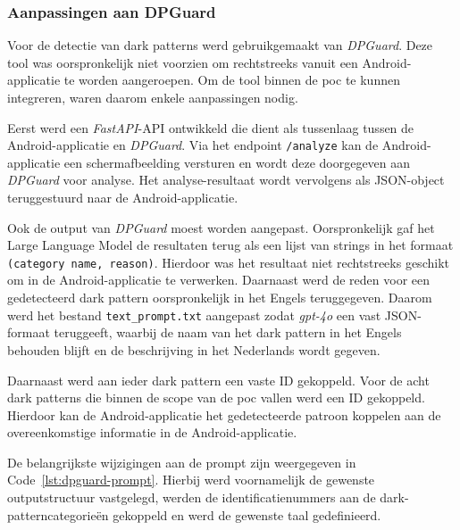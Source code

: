 \vspace{1em}

\subsubsection{Aanpassingen aan DPGuard}

\vspace{1em}

Voor de detectie van dark patterns werd gebruikgemaakt van \textit{DPGuard}. Deze tool was oorspronkelijk niet voorzien om rechtstreeks vanuit een Android-applicatie te worden aangeroepen. Om de tool binnen de \acrshort{poc} te kunnen integreren, waren daarom enkele aanpassingen nodig.

\vspace{1em}

Eerst werd een \textit{FastAPI}-API ontwikkeld die dient als tussenlaag tussen de Android-applicatie en \textit{DPGuard}. Via het endpoint \texttt{/analyze} kan de Android-applicatie een schermafbeelding versturen en wordt deze doorgegeven aan \textit{DPGuard} voor analyse. Het analyse-resultaat wordt vervolgens als JSON-object teruggestuurd naar de Android-applicatie.

\vspace{1em}

Ook de output van \textit{DPGuard} moest worden aangepast. Oorspronkelijk gaf het Large Language Model de resultaten terug als een lijst van strings in het formaat \texttt{(category name, reason)}. Hierdoor was het resultaat niet rechtstreeks geschikt om in de Android-applicatie te verwerken. Daarnaast werd de reden voor een gedetecteerd dark pattern oorspronkelijk in het Engels teruggegeven. Daarom werd het bestand \texttt{text\_prompt.txt} aangepast zodat \textit{gpt-4o} een vast JSON-formaat teruggeeft, waarbij de naam van het dark pattern in het Engels behouden blijft en de beschrijving in het Nederlands wordt gegeven.

\vspace{1em}

Daarnaast werd aan ieder dark pattern een vaste ID gekoppeld. Voor de acht dark patterns die binnen de scope van de \acrshort{poc} vallen werd een ID gekoppeld. Hierdoor kan de Android-applicatie het gedetecteerde patroon koppelen aan de overeenkomstige informatie in de Android-applicatie. 

\vspace{1em}

De belangrijkste wijzigingen aan de prompt zijn weergegeven in Code~\ref{lst:dpguard-prompt}. Hierbij werd voornamelijk de gewenste outputstructuur vastgelegd, werden de identificatienummers aan de dark-patterncategorieën gekoppeld en werd de gewenste taal gedefinieerd.

